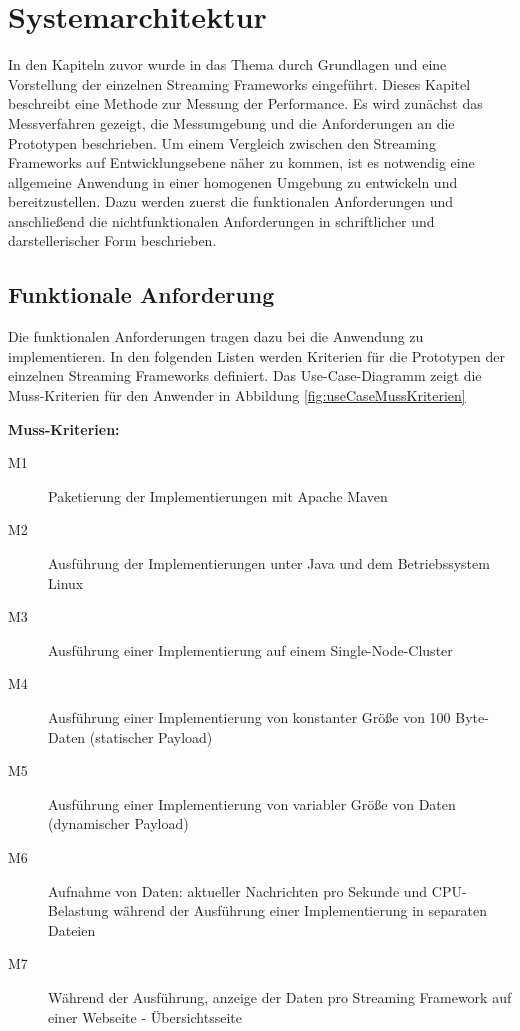 \chapter{Systemarchitektur}
\label{chapter:systemarchitekur}

In den Kapiteln zuvor wurde in das Thema durch Grundlagen und eine Vorstellung der einzelnen Streaming Frameworks eingeführt. Dieses Kapitel beschreibt eine Methode zur Messung der Performance. Es wird zunächst das Messverfahren gezeigt, die Messumgebung und die Anforderungen an die Prototypen beschrieben. Um einem Vergleich zwischen den Streaming Frameworks auf Entwicklungsebene näher zu kommen, ist es notwendig eine allgemeine Anwendung in einer homogenen Umgebung zu entwickeln und bereitzustellen. Dazu werden zuerst die funktionalen Anforderungen und anschließend die nichtfunktionalen Anforderungen in schriftlicher und darstellerischer Form beschrieben.

\section{Funktionale Anforderung}
\label{sec:funktAnforderung}
Die funktionalen Anforderungen tragen dazu bei die Anwendung zu implementieren. In den folgenden Listen werden Kriterien für die Prototypen der einzelnen Streaming Frameworks definiert. Das Use-Case-Diagramm zeigt die Muss-Kriterien für den Anwender in Abbildung \ref{fig:useCaseMussKriterien}

\textbf{Muss-Kriterien:}
\begin{description}
  \item[M1] Paketierung der Implementierungen mit Apache Maven	
	\item[M2] Ausführung der Implementierungen unter Java und dem Betriebssystem Linux
	\item[M3] Ausführung einer Implementierung auf einem Single-Node-Cluster	
	\item[M4] Ausführung einer Implementierung von konstanter Größe von 100 Byte-Daten (statischer Payload)
	\item[M5] Ausführung einer Implementierung von variabler Größe von Daten (dynamischer Payload)
	\item[M6] Aufnahme von Daten: aktueller Nachrichten pro Sekunde und CPU-Belastung während der Ausführung einer Implementierung in  separaten Dateien 
	\item[M7] Während der Ausführung, anzeige der Daten pro Streaming Framework auf einer Webseite - Übersichtsseite
\end{description}

